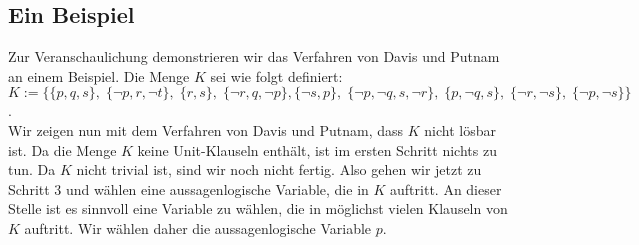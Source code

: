 \subsection{Ein Beispiel}
Zur Veranschaulichung demonstrieren wir das Verfahren von Davis und Putnam an einem Beispiel.
Die Menge $K$ sei wie folgt definiert: \\[0.2cm]
\hspace*{0.3cm}
 $K := \Big\{ \{p, q, s\},\; \{\neg p, r, \neg t\},\;  \{r, s\},\; \{\neg r, q, \neg p\}, 
               \{\neg s, p\},\; \{\neg p, \neg q, s, \neg r\},\; \{p, \neg q, s\},\; \{\neg r, \neg s\},\;
             \{\neg p, \neg s\} 
        \Big\}$. 
\\[0.2cm]
Wir zeigen nun mit dem Verfahren von Davis und Putnam, dass $K$ nicht lösbar ist.  Da die
Menge $K$ keine Unit-Klauseln enthält, ist im ersten Schritt nichts zu tun.  Da $K$ nicht
trivial ist, sind wir noch nicht fertig.  Also gehen wir jetzt zu Schritt 3 und wählen
eine aussagenlogische Variable, die in $K$ auftritt.  An dieser Stelle ist es sinnvoll
eine Variable zu wählen, die in möglichst vielen Klauseln von $K$ auftritt.  Wir wählen
daher die aussagenlogische Variable $p$.
